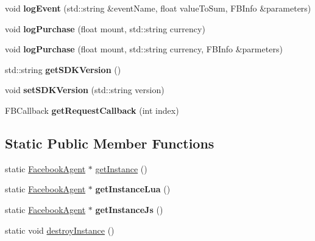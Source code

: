 \begin{DoxyCompactItemize}
void {\bfseries log\+Event} (std\+::string \&event\+Name, float value\+To\+Sum, F\+B\+Info \&parameters)
\item 
\mbox{\label{classcocos2d_1_1plugin_1_1FacebookAgent_a8252a381ca2d72296f049b5721d22dd3}} 
void {\bfseries log\+Purchase} (float mount, std\+::string currency)
\item 
\mbox{\label{classcocos2d_1_1plugin_1_1FacebookAgent_a8f32e4fad1b7bc7b2ace22be0494e2ec}} 
void {\bfseries log\+Purchase} (float mount, std\+::string currency, F\+B\+Info \&parmeters)
\item 
\mbox{\label{classcocos2d_1_1plugin_1_1FacebookAgent_a0c6dc93edf8880d98c18e1048a9b8b3c}} 
std\+::string {\bfseries get\+S\+D\+K\+Version} ()
\item 
\mbox{\label{classcocos2d_1_1plugin_1_1FacebookAgent_acec14b9c7ecd681e1dbf3cafd2b29abd}} 
void {\bfseries set\+S\+D\+K\+Version} (std\+::string version)
\item 
\mbox{\label{classcocos2d_1_1plugin_1_1FacebookAgent_ad30ae9661df3e91dcb0cfe549ae3de3b}} 
F\+B\+Callback {\bfseries get\+Request\+Callback} (int index)
\end{DoxyCompactItemize}
\subsection*{Static Public Member Functions}
\begin{DoxyCompactItemize}
\item 
static \hyperlink{classcocos2d_1_1plugin_1_1FacebookAgent}{Facebook\+Agent} $\ast$ \hyperlink{classcocos2d_1_1plugin_1_1FacebookAgent_a36931dfb681ef8a608cdea9987e72188}{get\+Instance} ()
\item 
\mbox{\label{classcocos2d_1_1plugin_1_1FacebookAgent_a59e274af1a5e1c0f574c2de78e081902}} 
static \hyperlink{classcocos2d_1_1plugin_1_1FacebookAgent}{Facebook\+Agent} $\ast$ {\bfseries get\+Instance\+Lua} ()
\item 
\mbox{\label{classcocos2d_1_1plugin_1_1FacebookAgent_aeeb7da9be94a72d37101f1849c4a208a}} 
static \hyperlink{classcocos2d_1_1plugin_1_1FacebookAgent}{Facebook\+Agent} $\ast$ {\bfseries get\+Instance\+Js} ()
\item 
static void \hyperlink{classcocos2d_1_1plugin_1_1FacebookAgent_a5017a07b6249969ba7cf3beb546b189f}{destroy\+Instance} ()
\end{DoxyCompactItemize}



